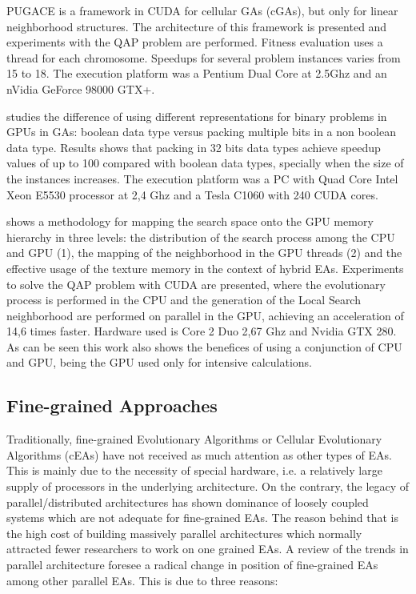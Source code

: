 \documentclass[prodmode,acmtecs]{acmsmall}
\begin{document}
PUGACE\cite{5586286} is a framework in CUDA for cellular GAs (cGAs), but only for linear neighborhood structures. The architecture of this framework is presented and experiments with the QAP problem are performed. Fitness evaluation uses a thread for each chromosome. Speedups for several problem instances varies from 15 to 18. The execution platform was a Pentium Dual Core at 2.5Ghz and an nVidia GeForce 98000 GTX+. %

\cite{Pedemonte:2011:BOG:2001858.2002031} studies the difference of using different representations for binary problems in GPUs in GAs: boolean data type versus packing multiple bits in a non boolean data type. Results shows that
packing in 32 bits data types achieve speedup values of up to 100 compared with boolean data types, specially when the size of the instances increases. The execution platform was a PC with Quad Core Intel Xeon E5530 processor at 2,4 Ghz and a Tesla C1060 with 240 CUDA cores.

\cite{5586403} shows a methodology for mapping the search space onto the GPU memory hierarchy in three levels: the distribution of the search process among the CPU and GPU (1), the mapping of the neighborhood in the GPU threads (2) and the effective usage of the texture memory in the context of hybrid EAs. Experiments to solve the QAP problem with CUDA are presented, where the evolutionary process is performed in the CPU and the generation of the Local Search neighborhood are performed on parallel in the GPU, achieving an acceleration of 14,6 times faster. Hardware used is Core 2 Duo 2,67 Ghz and Nvidia GTX 280. As can be seen this work also shows the benefices of using a conjunction of CPU and GPU, being the GPU used only for intensive calculations. %

\subsection{Fine-grained Approaches}

Traditionally, fine-grained Evolutionary Algorithms or Cellular Evolutionary Algorithms (cEAs) have not received as much attention as other types of EAs. This is mainly due to the necessity of special hardware, i.e. a relatively large supply of processors in the underlying architecture. On the contrary, the legacy of parallel/distributed architectures has shown dominance of loosely coupled systems which are not adequate for fine-grained EAs. The reason behind that is the high cost of building massively parallel architectures which normally attracted fewer researchers to work on one grained EAs. A review of the trends in parallel architecture foresee a radical change in position of fine-grained EAs among other parallel EAs. This is due to three reasons:
\end{document}

